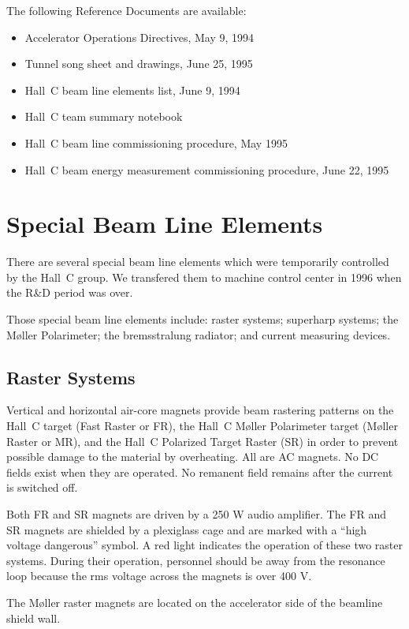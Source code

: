 {The following Reference Documents are available:

\begin{itemize}
\item{Accelerator Operations Directives, May 9, 1994}
\item{Tunnel song sheet and drawings, June 25, 1995}
\item{Hall~C beam line elements list, June 9, 1994}
\item{Hall~C team summary notebook}
\item{Hall~C beam line commissioning procedure, May 1995}
\item{Hall~C beam energy measurement commissioning procedure, June 22, 1995}
\end{itemize}

\section{Special Beam Line Elements}

There are several special beam line elements which were temporarily
controlled by the Hall~C group. We transfered them to machine
control center in 1996 when the R\&D period was over.

Those special beam line elements include:  raster systems; superharp systems; the M\o ller 
Polarimeter; the bremsstralung radiator; and current measuring devices.

\subsection{Raster Systems}

Vertical and horizontal air-core magnets provide beam
rastering patterns on the Hall~C target (Fast Raster or FR), the
Hall~C M\o ller Polarimeter target (M\o ller Raster or MR), and the Hall~C 
Polarized Target Raster (SR) in order to prevent possible damage to the material by
overheating. All are AC magnets. No DC fields 
exist when they are operated. No remanent field remains after
the current is switched off.

Both FR and SR magnets are driven by a 250 W audio amplifier. The FR
and SR magnets are shielded by a plexiglass cage and are marked with a
``high voltage dangerous'' symbol.  A red light indicates the
operation of these two raster systems. During their operation, personnel
should be away from the resonance loop because the rms voltage across
the magnets is over 400 V.

The M\o ller raster magnets are located on the accelerator side of the
beamline shield wall.

}
